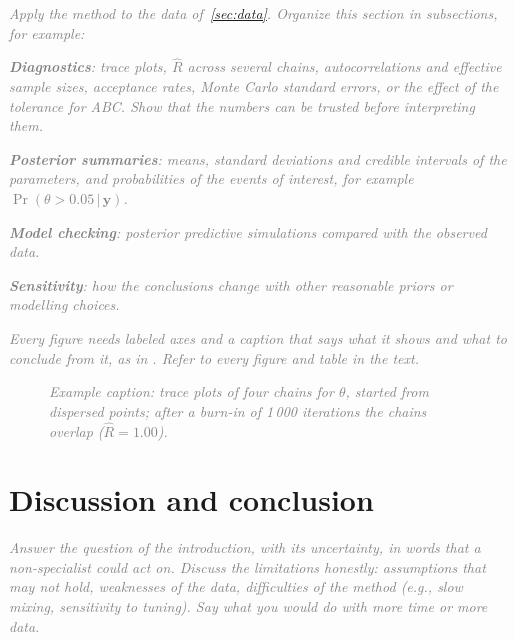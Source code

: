 \documentclass[12pt]{article}
\newcommand{\guide}[1]{\textit{\textcolor{gray}{#1}}}
\newcommand{\by}{\mathbf{y}}
\newcommand{\given}{\,\vert\,}
\begin{document}
\guide{Apply the method to the data of~\cref{sec:data}. Organize this section in subsections, for example:}
\begin{description}
  \item \guide{\textbf{Diagnostics}: trace plots, $\hat R$ across several chains, autocorrelations and effective sample sizes, acceptance rates, Monte Carlo standard errors, or the effect of the tolerance for ABC. Show that the numbers can be trusted before interpreting them.}
  \item \guide{\textbf{Posterior summaries}: means, standard deviations and credible intervals of the parameters, and probabilities of the events of interest, for example $\Pr(\theta > 0.05\given\by)$.}
  \item \guide{\textbf{Model checking}: posterior predictive simulations compared with the observed data.}
  \item \guide{\textbf{Sensitivity}: how the conclusions change with other reasonable priors or modelling choices.}
\end{description}
\guide{Every figure needs labeled axes and a caption that says what it shows and what to conclude from it, as in \Cref{fig:example}. Refer to every figure and table in the text.}

\begin{figure}[h]
  \centering
  \caption{\guide{Example caption: trace plots of four chains for $\theta$, started from dispersed points; after a burn-in of 1\,000 iterations the chains overlap ($\hat R = 1.00$).}}
  \label{fig:example}
\end{figure}

\section{Discussion and conclusion}\label{sec:discussion}

\guide{Answer the question of the introduction, with its uncertainty, in words that a non-specialist could act on. Discuss the limitations honestly: assumptions that may not hold, weaknesses of the data, difficulties of the method (e.g., slow mixing, sensitivity to tuning). Say what you would do with more time or more data.}

\end{document}
